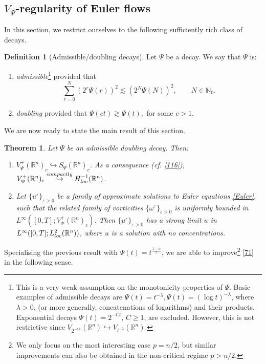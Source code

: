 \documentclass[11pt, a4paper,leqno]{amsart}
\newtheorem{theorem}{Theorem}
\theoremstyle{plain}
\numberwithin{equation}{section}
\theoremstyle{definition}
\newtheorem{definition}{Definition}
\theoremstyle{remark}
\def\R{\mathbb{R}}
\begin{document}
\subsection{$V_\Psi$-regularity of Euler flows}  In this section, we restrict ourselves to the following sufficiently rich class of decays. 


\begin{definition}[Admissible/doubling decays]\label{DefAdm}
Let $\Psi$ be a decay. We say that $\Psi$ is:
	\begin{enumerate}
	\item[(i)] \emph{admissible}\footnote{This is a very weak assumption on the monotonicity properties of $\Psi$.  Basic examples of admissible decays are $\Psi(t) = t^{-\lambda}, \Psi(t) = (\log t)^{-\lambda}$, where $\lambda > 0$, (or more generally, concatenations of logarithms) and their products. Exponential decays $\Psi(t) = 2^{-C t}, \, C \geq 1$, are excluded. However, this is not restrictive since $V_{2^{-C t}}(\R^n) \hookrightarrow V_{t^{-\lambda}}(\R^n)$.}  provided that
	$$
\sum_{r=0}^{N}(2^{r}\Psi(r))^{2}\lesssim(2^{N}\Psi(N))^{2}, \qquad N \in \mathbb{N}_0.
$$
\item[(ii)] \emph{doubling} provided that $\Psi(ct)\gtrsim\Psi(t),$ for some $c>1$.
\end{enumerate}
\end{definition}

We are now ready to state  the main result of this section. 

\begin{theorem}\label{ThmVPsi} 
Let $\Psi$ be an admissible doubling decay.  
Then:
	\begin{enumerate}
		\item[(i)]  $V^+_\Psi(\R^n)_c \hookrightarrow S_\Psi(\R^n)_{c}$. As a consequence (cf. \eqref{116}), $V^+_\Psi(\R^n)_c\overset{compactly}{\hookrightarrow}H^{-1}_{\emph{loc}}(\R^n
)$. 
		\item[(ii)] Let $\{u^\varepsilon\}_{\varepsilon > 0}$ be a family of approximate solutions to Euler equations \eqref{Euler}, such that the related family of vorticities $\{\omega^\varepsilon\}_{\varepsilon > 0}$ is uniformly bounded in $L^\infty([0, T]; V^+_\Psi(\R^n)_c)$. Then $\{u^\varepsilon\}_{\varepsilon > 0}$ has a strong limit $u$ in $L^\infty([0, T]; L^2_{\emph{loc}}(\R^n))$, where $u$ is a solution with no concentrations. 
	\end{enumerate}
\end{theorem}


Specialising the previous result with $\Psi(t) = t^{\frac{1-\alpha}{2}}$, we are able to improve\footnote{We only focus on the most interesting case $p = n/2$, but similar improvements can also be obtained in the non-critical regime $p > n/2$.} \eqref{71} in the following sense. 
\end{document}

